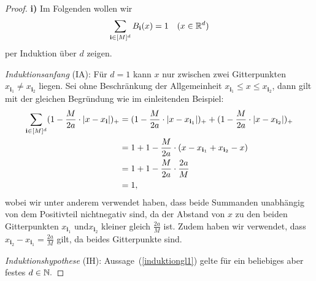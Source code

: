\begin{proof}
\textbf{i)} Im Folgenden wollen wir 
\begin{equation}
\label{induktiongl1}
\sum_{\mathbf{i} \in [M]^d} B_{\mathbf{i}}(x) = 1 \quad (x \in \mathbb{R}^d)
\end{equation}
per Induktion über $d$ zeigen. 
	
	 \emph{Induktionsanfang} (IA): Für $d = 1$ kann $x$ nur zwischen zwei Gitterpunkten $x_{\mathbf{i}_1} \neq x_{\mathbf{i}_2}$ liegen. Sei ohne Beschränkung der Allgemeinheit $x_{\mathbf{i}_1}\leq x \leq x_{\mathbf{i}_2}$, dann gilt mit der gleichen Begründung wie im einleitenden Beispiel:
	\begin{equation*}
	\begin{split}
	\sum_{\mathbf{i} \in [M]^d} (1 - \frac{M}{2a} \cdot |x - x_{\mathbf{i}}|)_+ & = (1 - \frac{M}{2a} \cdot |x - x_{\mathbf{i}_1}|)_+ + (1 - \frac{M}{2a} \cdot |x - x_{\mathbf{i}_2}|)_+ \\
	& = 1 + 1 - \frac{M}{2a} \cdot (x - x_{\mathbf{i}_1} + x_{\mathbf{i}_2} - x) \\
	& = 1 + 1 - \frac{M}{2a} \cdot \frac{2a}{M} \\
	& = 1,
	\end{split}
	\end{equation*} wobei wir unter anderem verwendet haben, dass beide Summanden unabhängig von dem Positivteil nichtnegativ sind, da der Abstand von $x$ zu den beiden Gitterpunkten $x_{\mathbf{i}_1}$ und$ x_{\mathbf{i}_2}$ kleiner gleich $\frac{2a}{M}$ ist. Zudem haben wir verwendet, dass $x_{\mathbf{i}_2} - x_{\mathbf{i}_1} = \frac{2a}{M}$ gilt, da beides Gitterpunkte sind.     
	
\emph{Induktionshypothese} (IH): Aussage~(\ref{induktiongl1}) gelte für ein beliebiges aber festes $d \in \mathbb{N}.$


\end{proof}
